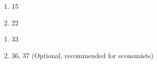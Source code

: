 \documentclass[12pt]{article}
\begin{document}
\begin{enumerate}
\setlength{\itemsep}{-1mm}
  \item 15
  \item 22
\end{enumerate}

\begin{enumerate}
\setlength{\itemsep}{-1mm}
  \item 33
  \item 36, 37  (Optional, recommended for economists)
\end{enumerate}
\end{document}
